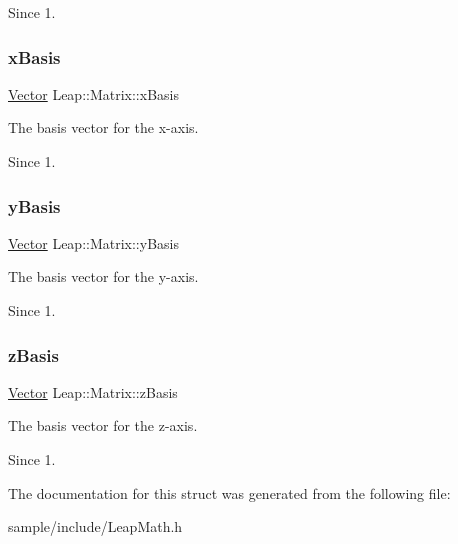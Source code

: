 \begin{DoxySince}{Since}
1. 
\end{DoxySince}
\mbox{\label{struct_leap_1_1_matrix_a9e5e56926e88315a309007843860eced}} 
\subsubsection{\texorpdfstring{x\+Basis}{xBasis}}
{\footnotesize\ttfamily \hyperlink{struct_leap_1_1_vector}{Vector} Leap\+::\+Matrix\+::x\+Basis}

The basis vector for the x-\/axis.


\begin{DoxyCodeInclude}
\end{DoxyCodeInclude}


\begin{DoxySince}{Since}
1. 
\end{DoxySince}
\mbox{\label{struct_leap_1_1_matrix_ad13e4c2baa3681ee9b92faf9da33b19b}} 
\subsubsection{\texorpdfstring{y\+Basis}{yBasis}}
{\footnotesize\ttfamily \hyperlink{struct_leap_1_1_vector}{Vector} Leap\+::\+Matrix\+::y\+Basis}

The basis vector for the y-\/axis.


\begin{DoxyCodeInclude}
\end{DoxyCodeInclude}


\begin{DoxySince}{Since}
1. 
\end{DoxySince}
\mbox{\label{struct_leap_1_1_matrix_a62c45d9b2370027de27781fadcfc13d8}} 
\subsubsection{\texorpdfstring{z\+Basis}{zBasis}}
{\footnotesize\ttfamily \hyperlink{struct_leap_1_1_vector}{Vector} Leap\+::\+Matrix\+::z\+Basis}

The basis vector for the z-\/axis.


\begin{DoxyCodeInclude}
\end{DoxyCodeInclude}


\begin{DoxySince}{Since}
1. 
\end{DoxySince}


The documentation for this struct was generated from the following file\+:\begin{DoxyCompactItemize}
\item 
sample/include/Leap\+Math.\+h\end{DoxyCompactItemize}
